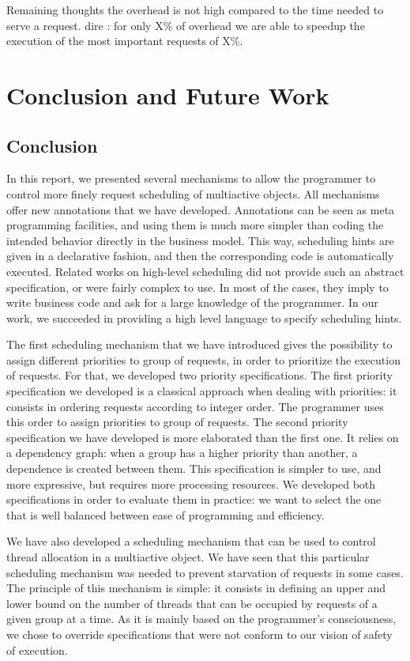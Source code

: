 \documentclass[11pt]{report}
\begin{document}
Remaining thoughts
the overhead is not high compared to the time needed to serve a request.
dire : for only X\% of overhead we are able to speedup the execution of the most important requests of X\%.

\chapter{Conclusion and Future Work} 
\section{Conclusion}
In this report, we presented several mechanisms to allow the programmer to control more finely request scheduling of multiactive objects. All mechanisms offer new annotations that we have developed. Annotations can be seen as meta programming facilities, and using them is much more simpler than coding the intended behavior directly in the business model. This way, scheduling hints are given in a declarative fashion, and then the corresponding code is automatically executed. Related works on high-level scheduling did not provide such an abstract specification, or were fairly complex to use. In most of the cases, they imply to write business code and ask for a large knowledge of the programmer. In our work, we succeeded in providing a high level language to specify scheduling hints.

The first scheduling mechanism that we have introduced gives the possibility to assign different priorities to group of requests, in order to prioritize the execution of requests. For that, we developed two priority specifications. The first priority specification we developed is a classical approach when dealing with priorities: it consists in ordering requests according to integer order. The programmer uses this order to assign priorities to group of requests. The second priority specification we have developed is more elaborated than the first one. It relies on a dependency graph: when a group has a higher priority than another, a dependence is created between them. This specification is simpler to use, and more expressive, but requires more processing resources. We developed both specifications in order to evaluate them in practice: we want to select the one that is well balanced between ease of programming and efficiency.

We have also developed a scheduling mechanism that can be used to control thread allocation in a multiactive object. We have seen that this particular scheduling mechanism was needed to prevent starvation of requests in some cases. The principle of this mechanism is simple: it consists in defining an upper and lower bound on the number of threads that can be occupied by requests of a given group at a time. As it is mainly based on the programmer's consciousness, we chose to override specifications that were not conform to our vision of safety of execution.
\end{document}
